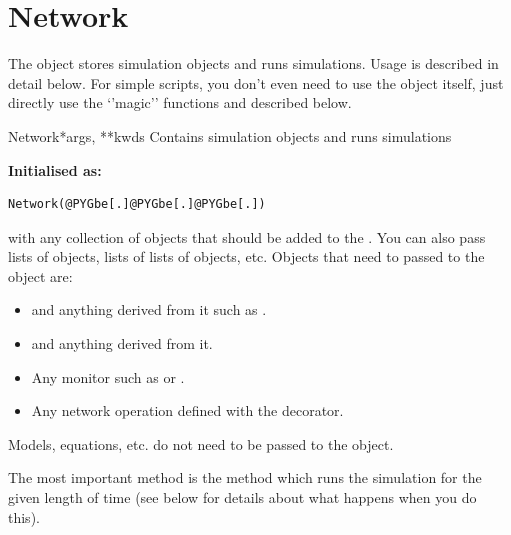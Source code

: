 \documentclass[letterpaper,10pt]{manual}
\begin{document}
\resetcurrentobjects


\section{Network}

The \hyperlink{brian.Network}{} object stores simulation objects and runs simulations. Usage
is described in detail below. For simple scripts, you don't even need to
use the \hyperlink{brian.Network}{} object itself, just directly use the `'magic'' functions
\hyperlink{brian.run}{} and \hyperlink{brian.reinit}{} described below.


\hypertarget{brian.Network}{}\begin{classdesc}{Network}{*args, **kwds}
Contains simulation objects and runs simulations

\textbf{Initialised as:}

\begin{Verbatim}[commandchars=@\[\]]
Network(@PYGbe[.]@PYGbe[.]@PYGbe[.])
\end{Verbatim}

with  any collection of objects that should be added to the \hyperlink{brian.Network}{}.
You can also pass lists of objects, lists of lists of objects, etc. Objects
that need to passed to the \hyperlink{brian.Network}{} object are:
\begin{itemize}
\item {} 
\hyperlink{brian.NeuronGroup}{} and anything derived from it such as \hyperlink{brian.PoissonGroup}{}.

\item {} 
\hyperlink{brian.Connection}{} and anything derived from it.

\item {} 
Any monitor such as \hyperlink{brian.SpikeMonitor}{} or \hyperlink{brian.StateMonitor}{}.

\item {} 
Any network operation defined with the \hyperlink{brian.network_operation}{} decorator.

\end{itemize}

Models, equations, etc. do not need to be passed to the \hyperlink{brian.Network}{} object.

The most important method is the  method which runs the simulation
for the given length of time (see below for details about what happens when you
do this).


\end{classdesc}
\end{document}
